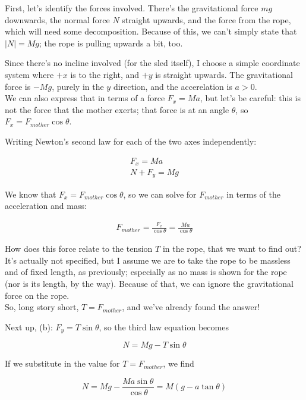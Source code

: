 \documentclass[12pt,a4paper]{report}
\begin{document}
First, let's identify the forces involved. There's the gravitational force $m g$ downwards, the normal force $N$ straight upwards, and the force from the rope, which will need some decomposition. Because of this, we can't simply state that $|N| = M g$; the rope is pulling upwards a bit, too.

Since there's no incline involved (for the sled itself), I choose a simple coordinate system where $+x$ is to the right, and $+y$ is straight upwards. The gravitational force is $-M g$, purely in the $y$ direction, and the accerelation is $a > 0$.\\
We can also express that in terms of a force $\displaystyle F_x = M a$, but let's be careful: this is not the force that the mother exerts; that force is at an angle $\theta$, so $F_x = F_{mother} \cos \theta$.

Writing Newton's second law for each of the two axes independently:

\begin{align}
F_x = M a\\
N + F_y = M g
\end{align}

We know that $F_x = F_{mother} \cos \theta$, so we can solve for $F_{mother}$ in terms of the acceleration and mass:

\begin{align}
F_{mother} = \frac{F_x}{\cos \theta} = \frac{M a}{\cos \theta}
\end{align}

How does this force relate to the tension $T$ in the rope, that we want to find out? It's actually not specified, but I assume we are to take the rope to be massless and of fixed length, as previously; especially as no mass is shown for the rope (nor is its length, by the way). Because of that, we can ignore the gravitational force on the rope.\\
So, long story short, $T = F_{mother}$, and we've already found the answer!

Next up, (b): $F_y = T \sin \theta$, so the third law equation becomes

\begin{equation}
N = M g - T \sin \theta
\end{equation}

If we substitute in the value for $T = F_{mother}$, we find

\begin{equation}
N = M g - \frac{M a \sin \theta}{\cos \theta} = M(g - a \tan \theta)
\end{equation}
\end{document}
